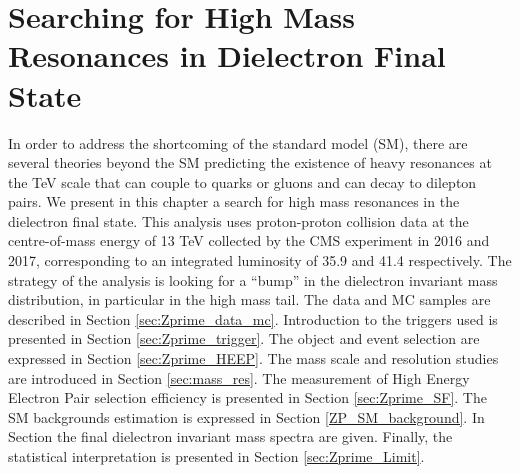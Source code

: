 \chapter{Searching for High Mass Resonances in Dielectron Final State}\label{chap:Zprime}
In order to address the shortcoming of the standard model (SM), there are several theories beyond the SM predicting the existence of heavy resonances at the TeV scale that can couple to quarks or gluons and can decay to dilepton pairs. We present in this chapter a search for high mass resonances in the dielectron final state. This analysis uses proton-proton collision data at the centre-of-mass energy of 13 TeV collected by the CMS experiment in 2016 and 2017, corresponding to an integrated luminosity of 35.9 \fbinv and 41.4 \fbinv respectively. The strategy of the analysis is looking for a ``bump'' in the dielectron invariant mass distribution, in particular in the high mass tail. The data and MC samples are described in Section \ref{sec:Zprime_data_mc}. Introduction to the triggers used is presented in Section \ref{sec:Zprime_trigger}. The object and event selection are expressed in Section \ref{sec:Zprime_HEEP}. The mass scale and resolution studies are introduced in Section \ref{sec:mass_res}. The measurement of High Energy Electron Pair selection efficiency is presented in Section \ref{sec:Zprime_SF}. The SM backgrounds estimation is expressed in Section \ref{ZP_SM_background}. In Section the final dielectron invariant mass spectra are given. Finally, the statistical interpretation is presented in Section \ref{sec:Zprime_Limit}.

























